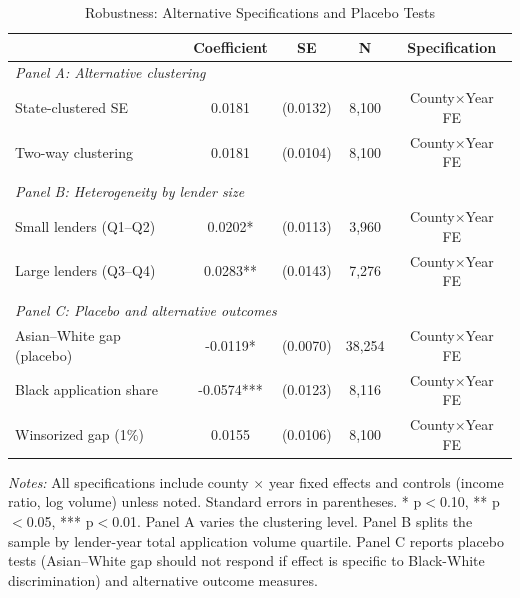 \begin{table}[H]
\centering
\caption{Robustness: Alternative Specifications and Placebo Tests}
\label{tab:robust}
\begin{threeparttable}
\begin{tabular}{lcccc}
\toprule
& Coefficient & SE & N & Specification \\
\midrule
\multicolumn{5}{l}{\textit{Panel A: Alternative clustering}} \\
State-clustered SE & 0.0181 & (0.0132) & 8,100 & County$\times$Year FE \\
Two-way clustering & 0.0181 & (0.0104) & 8,100 & County$\times$Year FE \\
\\
\multicolumn{5}{l}{\textit{Panel B: Heterogeneity by lender size}} \\
Small lenders (Q1--Q2) & 0.0202* & (0.0113) & 3,960 & County$\times$Year FE \\
Large lenders (Q3--Q4) & 0.0283** & (0.0143) & 7,276 & County$\times$Year FE \\
\\
\multicolumn{5}{l}{\textit{Panel C: Placebo and alternative outcomes}} \\
Asian--White gap (placebo) & -0.0119* & (0.0070) & 38,254 & County$\times$Year FE \\
Black application share & -0.0574*** & (0.0123) & 8,116 & County$\times$Year FE \\
Winsorized gap (1\%) & 0.0155 & (0.0106) & 8,100 & County$\times$Year FE \\
\bottomrule
\end{tabular}
\begin{tablenotes}[flushleft]\small
\item \textit{Notes:} All specifications include county $\times$ year fixed effects and controls (income ratio, log volume) unless noted. Standard errors in parentheses. * p$<$0.10, ** p$<$0.05, *** p$<$0.01. Panel A varies the clustering level. Panel B splits the sample by lender-year total application volume quartile. Panel C reports placebo tests (Asian--White gap should not respond if effect is specific to Black-White discrimination) and alternative outcome measures.
\end{tablenotes}
\end{threeparttable}
\end{table}
